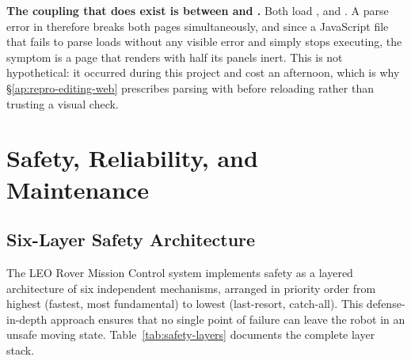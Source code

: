 \textbf{The coupling that does exist is between  and
.} Both load ,  and
. A parse error in  therefore breaks both pages
simultaneously, and since a JavaScript file that fails to parse loads without
any visible error and simply stops executing, the symptom is a page that
renders with half its panels inert. This is not hypothetical: it occurred
during this project and cost an afternoon, which is why
\S\ref{ap:repro-editing-web} prescribes parsing  with
 before reloading rather than trusting a visual check.

\chapter{Safety, Reliability, and Maintenance}
\label{ch:safety}

\section{Six-Layer Safety Architecture}

The LEO Rover Mission Control system implements safety as a layered architecture of six independent mechanisms, arranged in priority order from highest (fastest, most fundamental) to lowest (last-resort, catch-all). This defense-in-depth approach ensures that no single point of failure can leave the robot in an unsafe moving state. Table~\ref{tab:safety-layers} documents the complete layer stack.


